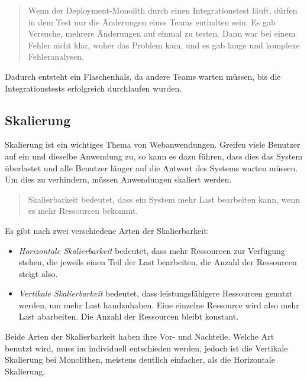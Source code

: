 \begin{quotation}
    \frqq Wenn der Deployment-Monolith durch einen Integrationstest läuft, dürfen in dem Test nur die Änderungen eines Teams enthalten sein. Es gab Versuche, mehrere Änderungen auf einmal zu testen. Dann war bei einem Fehler nicht klar, woher das Problem kam, und es gab lange und komplexe  Fehleranalysen.\flqq\ \cite[S. 16]{EWolff2016:Microservices}
\end{quotation}
Dadurch entsteht ein Flaschenhals, da andere Teams warten müssen, bis die Integrationstests erfolgreich durchlaufen wurden.


\subsection{Skalierung}
\label{subsec:SkalierungMonolithisch}
Skalierung ist ein wichtiges Thema von Webanwendungen. Greifen viele Benutzer auf ein und dieselbe Anwendung zu, so kann es dazu führen, dass dies das System überlastet und alle Benutzer länger auf die Antwort des Systems warten müssen. Um dies zu verhindern, müssen Anwendungen skaliert werden.

\begin{quotation}
    \frqq Skalierbarkeit bedeutet, dass ein System mehr Last bearbeiten kann, wenn es mehr Ressourcen bekommt.\flqq\ \cite[S. 150]{EWolff2016:Microservices}
\end{quotation}

Es gibt nach \cite[S. 150]{EWolff2016:Microservices} zwei verschiedene Arten der Skalierbarkeit:
\begin{itemize}
    \item \textit{Horizontale Skalierbarkeit} bedeutet, dass mehr Ressourcen zur Verfügung stehen, die jeweils einen Teil der Last bearbeiten, die Anzahl der Ressourcen steigt also.
    \item \textit{Vertikale Skalierbarkeit} bedeutet, dass leistungsfähigere Ressourcen genutzt werden, um mehr Last handzuhaben. Eine einzelne Ressource wird also mehr Last abarbeiten. Die Anzahl der Ressourcen bleibt konstant.
\end{itemize}

Beide Arten der Skalierbarkeit haben ihre Vor- und Nachteile. Welche Art benutzt wird, muss im individuell entschieden werden, jedoch ist die Vertikale Skalierung bei Monolithen, meistens deutlich einfacher, als die Horizontale Skalierung.